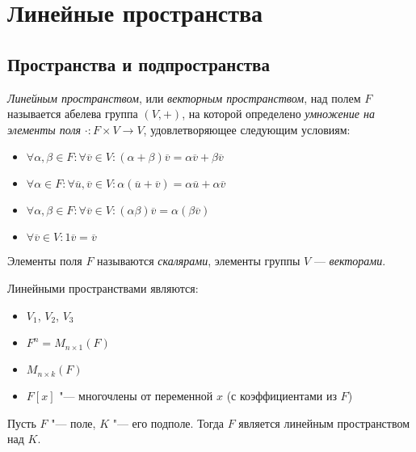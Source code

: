 \section{Линейные пространства}

\subsection{Пространства и подпространства}

\begin{definition}
	\textit{Линейным пространством}, или \textit{векторным пространством}, над полем $F$ называется абелева группа $(V, +)$, на которой определено \textit{умножение на элементы поля} $\cdot: F \times V \rightarrow V$, удовлетворяющее следующим условиям:
	\begin{itemize}
		\item $\forall \alpha, \beta \in F: \forall \overline{v} \in V: (\alpha + \beta)\overline{v} = \alpha\overline{v} + \beta\overline{v}$
		\item $\forall \alpha \in F: \forall \overline{u}, \overline{v} \in V: \alpha(\overline{u} + \overline{v}) = \alpha\overline{u} + \alpha\overline{v}$
		\item $\forall \alpha, \beta \in F: \forall \overline{v} \in V: (\alpha\beta)\overline{v} = \alpha(\beta\overline{v})$
		\item $\forall \overline{v} \in V: 1\overline{v} = \overline{v}$
	\end{itemize}

	Элементы поля $F$ называются \textit{скалярами}, элементы группы $V$ --- \textit{векторами}.
\end{definition}

\pagebreak 
\begin{example}
	Линейными пространствами являются:
	\begin{itemize}
		\item $V_1$, $V_2$, $V_3$
		\item $F^n = M_{n \times 1}(F)$
		\item $M_{n \times k}(F)$
		\item $F[x]$ "--- многочлены от переменной $x$ (с коэффициентами из $F$)
	\end{itemize}
\end{example}

\begin{example}
	Пусть $F$ "--- поле, $K$ "--- его подполе. Тогда $F$ является линейным пространством над $K$.
\end{example}

